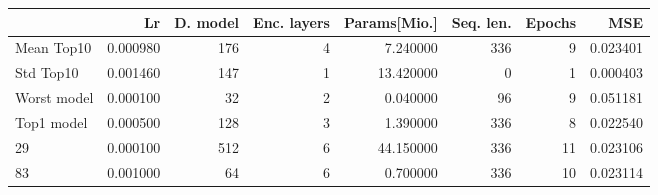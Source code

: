 \begin{tabular}{lrrrrrrr}
\toprule
 & Lr & D. model & Enc. layers & Params[Mio.] & Seq. len. & Epochs & MSE \\
\midrule
Mean Top10 & 0.000980 & 176 & 4 & 7.240000 & 336 & 9 & 0.023401 \\
Std Top10 & 0.001460 & 147 & 1 & 13.420000 & 0 & 1 & 0.000403 \\
Worst model & 0.000100 & 32 & 2 & 0.040000 & 96 & 9 & 0.051181 \\
Top1 model & 0.000500 & 128 & 3 & 1.390000 & 336 & 8 & 0.022540 \\
29 & 0.000100 & 512 & 6 & 44.150000 & 336 & 11 & 0.023106 \\
83 & 0.001000 & 64 & 6 & 0.700000 & 336 & 10 & 0.023114 \\
\bottomrule
\end{tabular}
